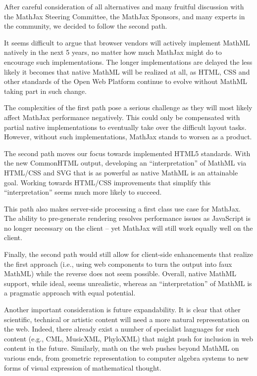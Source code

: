 \documentclass[]{amsart}
\begin{document}
After careful consideration of all alternatives and many fruitful
discussion with the MathJax Steering Committee, the MathJax Sponsors,
and many experts in the community, we decided to follow the second path.

It seems difficult to argue that browser vendors will actively implement
MathML natively in the next 5 years, no matter how much MathJax might do
to encourage such implementations. The longer implementations are
delayed the less likely it becomes that native MathML will be realized
at all, as HTML, CSS and other standards of the Open Web Platform
continue to evolve without MathML taking part in such change.

The complexities of the first path pose a serious challenge as they will
most likely affect MathJax performance negatively. This could only be
compensated with partial native implementations to eventually take over
the difficult layout tasks. However, without such implementations,
MathJax stands to worsen as a product.

The second path moves our focus towards implemented HTML5 standards.
With the new CommonHTML output, developing an ``interpretation'' of
MathML via HTML/CSS and SVG that is as powerful as native MathML is an
attainable goal. Working towards HTML/CSS improvements that simplify
this ``interpretation'' seems much more likely to succeed.

This path also makes server-side processing a first class use case for
MathJax. The ability to pre-generate rendering resolves performance
issues as JavaScript is no longer necessary on the client -- yet MathJax
will still work equally well on the client.

Finally, the second path would still allow for client-side enhancements
that realize the first approach (i.e., using web components to turn the
output into faux MathML) while the reverse does not seem possible.
Overall, native MathML support, while ideal, seems unrealistic, whereas
an ``interpretation'' of MathML is a pragmatic approach with equal
potential.

Another important consideration is future expandability. It is clear
that other scientific, technical or artistic content will need a more
natural representation on the web. Indeed, there already exist a number
of specialist languages for such content (e.g., CML, MusicXML,
PhyloXML) that might push for inclusion in web content in the future.
Similarly, math on the web pushes beyond MathML on various ends, from
geometric representation to computer algebra systems to new forms of
visual expression of mathematical thought.
\end{document}
